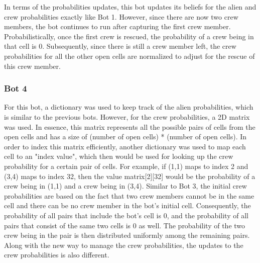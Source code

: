 \documentclass[11pt]{article}
\begin{document}
In terms of the probabilities updates, this bot updates its beliefs for the alien and crew probabilities exactly like Bot 1. However, since there are now two crew members, the bot continues to run after capturing the first crew member. Probabilistically, once the first crew is rescued, the probability of a crew being in that cell is 0. Subsequently, since there is still a crew member left, the crew probabilities for all the other open cells are normalized to adjust for the rescue of this crew member. 

\subsubsection{Bot 4}
For this bot, a dictionary was used to keep track of the alien probabilities, which is similar to the previous bots. However, for the crew probabilities, a 2D matrix was used. In essence, this matrix represents all the possible pairs of cells from the open cells and has a size of (number of open cells) * (number of open cells). In order to index this matrix efficiently, another dictionary was used to map each cell to an "index value", which then would be used for looking up the crew probability for a certain pair of cells. For example, if (1,1) maps to index 2 and (3,4) maps to index 32, then the value matrix[2][32] would be the probability of a crew being in (1,1) and a crew being in (3,4). Similar to Bot 3, the initial crew probabilities are based on the fact that two crew members cannot be in the same cell and there can be no crew member in the bot's initial cell. Consequently, the probability of all pairs that include the bot's cell is 0, and the probability of all pairs that consist of the same two cells is 0 as well. The probability of the two crew being in the pair is then distributed uniformly among the remaining pairs. Along with the new way to manage the crew probabilities, the updates to the crew probabilities is also different. 

\medskip
\end{document}

